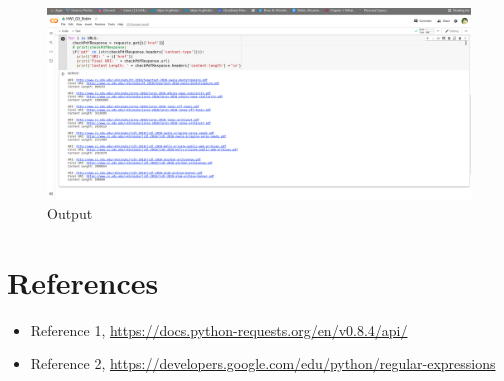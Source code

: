 \documentclass[12pt]{article}
\begin{document}
\begin{figure}[h]
    \centering
    \includegraphics[trim=0 20 10 50, clip, width=\textwidth] {HW1_output.png}
    \caption{Output}
    \label{fig:web-growth}
\end{figure}

\section*{References}

\begin{itemize}
    \item {Reference 1, \url{https://docs.python-requests.org/en/v0.8.4/api/}}
    \item {Reference 2, \url{https://developers.google.com/edu/python/regular-expressions}}
\end{itemize}
\end{document}
